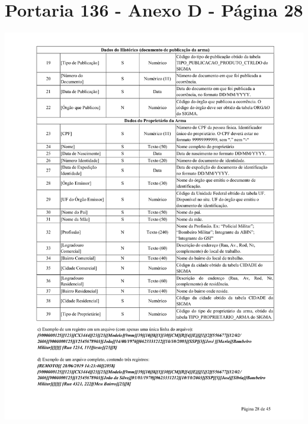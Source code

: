 \chapter{Portaria 136 - Anexo D - Página 28}
\includegraphics[scale=0.7]{imagens/AnexoA3-AnexoD-portaria-136}

